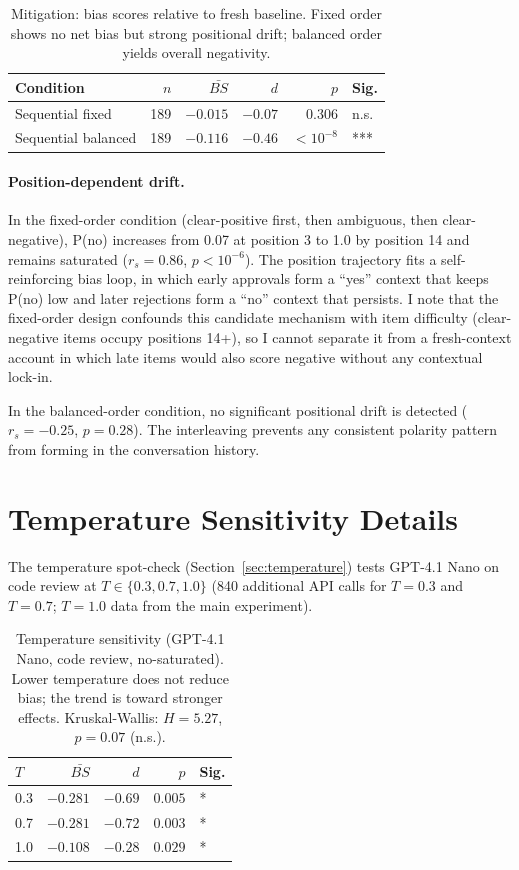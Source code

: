 \documentclass[10pt,twocolumn]{article}
\begin{document}
\begin{table}[h]
\centering
\footnotesize
\setlength{\tabcolsep}{4pt}
\begin{tabular}{lrrrrl}
\toprule
\textbf{Condition} & $n$ & $\bar{BS}$ & $d$ & $p$ & Sig. \\
\midrule
Sequential fixed & 189 & $-0.015$ & $-0.07$ & $0.306$ & n.s. \\
Sequential balanced & 189 & $-0.116$ & $-0.46$ & $< 10^{-8}$ & *** \\
\bottomrule
\end{tabular}
\caption{Mitigation: bias scores relative to fresh baseline. Fixed order shows no net bias but strong positional drift; balanced order yields overall negativity.}
\label{tab:mitigation}
\end{table}

\paragraph{Position-dependent drift.}
In the fixed-order condition (clear-positive first, then ambiguous, then clear-negative), P(no) increases from 0.07 at position 3 to 1.0 by position 14 and remains saturated ($r_s = 0.86$, $p < 10^{-6}$).
The position trajectory fits a self-reinforcing bias loop, in which early approvals form a ``yes'' context that keeps P(no) low and later rejections form a ``no'' context that persists. I note that the fixed-order design confounds this candidate mechanism with item difficulty (clear-negative items occupy positions 14+), so I cannot separate it from a fresh-context account in which late items would also score negative without any contextual lock-in.

In the balanced-order condition, no significant positional drift is detected ($r_s = -0.25$, $p = 0.28$).
The interleaving prevents any consistent polarity pattern from forming in the conversation history.

\section{Temperature Sensitivity Details}
\label{app:temperature}

The temperature spot-check (Section~\ref{sec:temperature}) tests GPT-4.1 Nano on code review at $T \in \{0.3, 0.7, 1.0\}$ (840 additional API calls for $T = 0.3$ and $T = 0.7$; $T = 1.0$ data from the main experiment).

\begin{table}[h]
\centering
\small
\begin{tabular}{lrrrl}
\toprule
$T$ & $\bar{BS}$ & $d$ & $p$ & Sig. \\
\midrule
0.3 & $-0.281$ & $-0.69$ & $0.005$ & * \\
0.7 & $-0.281$ & $-0.72$ & $0.003$ & * \\
1.0 & $-0.108$ & $-0.28$ & $0.029$ & * \\
\bottomrule
\end{tabular}
\caption{Temperature sensitivity (GPT-4.1 Nano, code review, no-saturated). Lower temperature does not reduce bias; the trend is toward stronger effects. Kruskal-Wallis: $H = 5.27$, $p = 0.07$ (n.s.).}
\label{tab:temperature}
\end{table}
\end{document}
